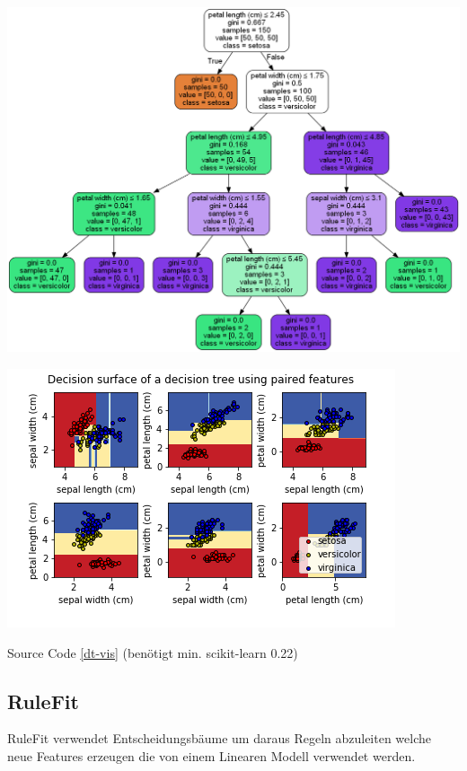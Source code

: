 \documentclass[
  12pt, %
  a4paper, %
  oneside, %
  openany, 
  numbers=noenddot, %
  BCOR=5mm, %
  parskip=half*, %
  thesis, %
]{bfhbook}
\begin{document}
\begin{center}
\begin{minipage}[t]{0.45\linewidth}
\centering
	\includegraphics[width=\textwidth]{Bilder/iris-dt-explained.png}
\end{minipage}\hfill
\begin{minipage}[t]{0.45\linewidth}
\centering
	\includegraphics[width=\textwidth]{Bilder/iris-dt-decision-surface.png}
\end{minipage}
\end{center}
Source Code \ref{dt-vis} (benötigt min. scikit-learn 0.22)

\subsection{RuleFit}
RuleFit \parencite{Friedman2008} verwendet Entscheidungsbäume um daraus Regeln abzuleiten welche neue Features erzeugen die von einem Linearen Modell verwendet werden. 
\end{document}
